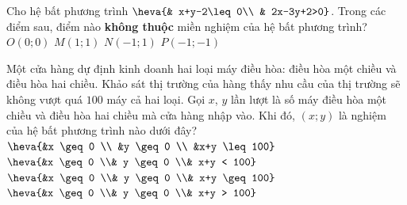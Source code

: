 \begin{ex}%
	Cho hệ bất phương trình $\heva{& x+y-2\leq 0\\ & 2x-3y+2>0}$. Trong các điểm sau, điểm nào \textbf{không thuộc} miền nghiệm của hệ bất phương trình?
	\choice
	{$O\left(0;0\right)$}
	{$M\left(1;1\right)$}
	{\True $N\left(-1;1\right)$}
	{$P\left(-1;-1\right)$}
	
\end{ex}
\begin{ex}%
	Một cửa hàng dự định kinh doanh hai loại máy điều hòa: điều hòa một chiều và điều hòa hai chiều. Khảo sát thị trường của hàng thấy nhu cầu của thị trường sẽ không vượt quá $100$ máy cả hai loại. Gọi $x$, $y$ lần lượt là số máy điều hòa một chiều và điều hòa hai chiều mà cửa hàng nhập vào. Khi đó, $(x; y)$ là nghiệm của hệ bất phương trình nào dưới đây?
	\choice
	{\True $\heva{&x \geq 0 \\ &y \geq 0 \\ &x+y \leq 100}$}
	{$\heva{&x \geq 0 \\& y \geq 0 \\& x+y < 100}$}
	{$\heva{&x \geq 0 \\& y \geq 0 \\& x+y \geq 100}$}
	{$\heva{&x \geq 0 \\& y \geq 0 \\& x+y > 100}$}
\end{ex}

